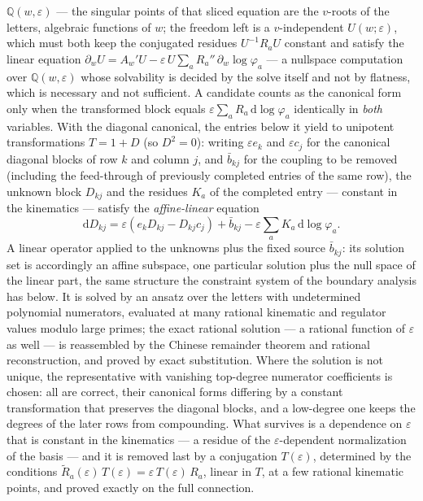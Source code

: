 \documentclass[11pt]{article}
\newcommand{\eps}{\varepsilon}
\newcommand{\dd}{\mathrm{d}}
\newcommand{\Q}{\mathbb{Q}}
\begin{document}
$\Q(w,\eps)$ --- the singular points of that sliced equation are the
$v$-roots of the letters, algebraic functions of $w$; the freedom left
is a $v$-independent $U(w;\eps)$,
which must both keep the conjugated residues $U^{-1}R_aU$ constant
and satisfy the linear equation
$\partial_w U = A_w'U - \eps\,U\sum_a R_a''\,\partial_w\log\varphi_a$
--- a nullspace computation over $\Q(w,\eps)$ whose solvability is
decided by the solve itself and not by flatness, which is necessary
and not sufficient.  A candidate counts
as the canonical form only when the transformed block equals
$\eps\sum_a R_a\,\dd\log\varphi_a$ identically in \emph{both}
variables.  With
the diagonal canonical, the entries below it yield to unipotent
transformations $T = 1 + D$ (so $D^2 = 0$): writing $\eps e_k$ and
$\eps c_j$ for the canonical diagonal blocks of row $k$ and column
$j$, and $\bar b_{kj}$ for the coupling to be removed (including
the feed-through of previously completed entries of the same row),
the unknown block $D_{kj}$ and the residues $K_a$ of the completed
entry --- constant in the kinematics --- satisfy the
\emph{affine-linear} equation
\begin{equation}
  \dd D_{kj} = \eps( e_k D_{kj} - D_{kj} c_j ) + \bar b_{kj}
  - \eps \textstyle\sum_a K_a\, \dd\log\varphi_a .
\end{equation}
A linear operator applied to the unknowns plus the fixed source
$\bar b_{kj}$: its solution set is accordingly an affine subspace, one
particular solution plus the null space of the linear part, the same
structure the constraint system of the boundary analysis has below.
It is solved by an ansatz over the letters with
undetermined polynomial numerators, evaluated at many rational
kinematic and regulator values modulo large primes; the exact
rational solution --- a rational function of $\eps$ as well --- is
reassembled by the Chinese remainder theorem and rational
reconstruction, and proved by exact substitution.  Where the solution
is not unique, the representative with vanishing top-degree numerator
coefficients is chosen: all are correct, their canonical forms
differing by a constant transformation that preserves the diagonal
blocks, and a low-degree one keeps the degrees of the later rows from
compounding.  What survives is a dependence on $\eps$ that
is constant in the kinematics --- a residue of the $\eps$-dependent
normalization of the basis --- and it is removed last by a
conjugation $T(\eps)$, determined by the conditions
$\tilde R_a(\eps)\,T(\eps) = \eps\,T(\eps)\,R_a$, linear in $T$, at a
few rational kinematic points, and proved exactly on the full
connection.
\end{document}
